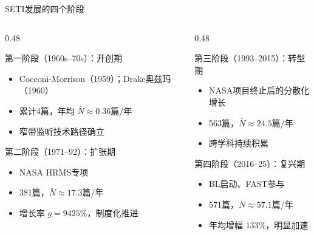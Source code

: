 \documentclass{sysupptthesis}
\begin{document}
\begin{frame}{SETI发展的四个阶段}
    \begin{columns}[T]
        \begin{column}{0.48\textwidth}
            \begin{block}{第一阶段（1960s--70s）：开创期}
                \begin{itemize}\small
                    \item Cocconi-Morrison（1959）；Drake奥兹玛（1960）
                    \item 累计4篇，年均 $\bar{N} \approx 0.36$篇/年
                    \item 窄带监听技术路径确立
                \end{itemize}
            \end{block}
            \begin{block}{第二阶段（1971--92）：扩张期}
                \begin{itemize}\small
                    \item NASA HRMS专项
                    \item 381篇，$\bar{N} \approx 17.3$篇/年
                    \item 增长率 $g = 9425\%$，制度化推进
                \end{itemize}
            \end{block}
        \end{column}
        \begin{column}{0.48\textwidth}
            \begin{block}{第三阶段（1993--2015）：转型期}
                \begin{itemize}\small
                    \item NASA项目终止后的分散化增长
                    \item 563篇，$\bar{N} \approx 24.5$篇/年
                    \item 跨学科持续积累
                \end{itemize}
            \end{block}
            \begin{block}{第四阶段（2016--25）：复兴期}
                \begin{itemize}\small
                    \item BL启动、FAST参与
                    \item 571篇，$\bar{N} \approx 57.1$篇/年
                    \item 年均增幅 $133\%$，明显加速
                \end{itemize}
            \end{block}
        \end{column}
    \end{columns}
\end{frame}
\end{document}
